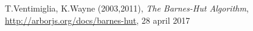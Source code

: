\begin{thebibliography}{9}
T.Ventimiglia, K.Wayne (2003,2011), \textit{The Barnes-Hut Algorithm}, \url{http://arborjs.org/docs/barnes-hut}, 28 april 2017

\end{thebibliography}
